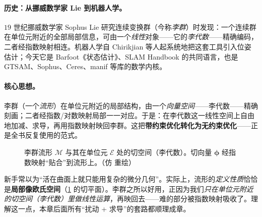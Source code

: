 \paragraph{历史：从挪威数学家 Lie 到机器人学。}
$19$ 世纪挪威数学家 Sophus Lie 研究连续变换群（今称\emph{李群}）时发现：一个连续群在单位元附近的全部局部信息，可由一个\emph{线性}对象——它的\emph{李代数}——精确编码，二者经指数映射相连。机器人学自 Chirikjian\cite{chirikjian2011stochastic} 等人起系统地把这套工具引入位姿估计；今天它是 Barfoot《状态估计》\cite{barfoot2024state}、SLAM Handbook\cite{carlone2026handbook} 的共同语言，也是 GTSAM、Sophus、Ceres、manif 等库的数学内核。

\paragraph{核心思想。}
李群（一个\emph{流形}）在单位元附近的局部结构，由一个\emph{向量空间}——李代数——精确刻画；二者经指数/对数映射局部一一对应。于是：在李代数这一线性空间上自由地加减、求导，再用指数映射映回李群。这把\textbf{带约束优化转化为无约束优化}——正是全书反复使用的范式。

\begin{figure}[ht]
\centering
{}
\caption{李群流形 $\mathcal{M}$ 与其在单位元 $\mathcal{E}$ 处的切空间（李代数）。切向量 $\boldsymbol{\phi}$ 经指数映射“贴合”到流形上。（仿 \cite{barfoot2024state} 重绘）}
\label{fig:lie-manifold}
\end{figure}

\begin{pitfall}[概念误区：“流形 = 弯曲，所以一定难算”]
新手常以为“活在曲面上就只能用复杂的微分几何”。实际上，流形的\emph{定义性质}恰恰是\textbf{局部像欧氏空间}（\cref{fig:lie-manifold} 的切平面）。李群之所以好用，正因为我们\emph{只在单位元附近的切空间（李代数）里做线性运算}，再映回去——难的部分被指数映射吸收了。理解这一点，本章后面所有“扰动 + 求导”的套路都顺理成章。
\end{pitfall}

